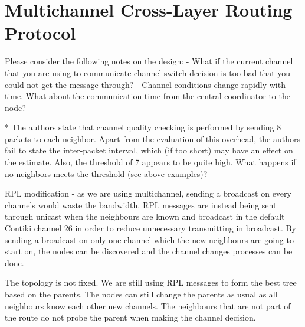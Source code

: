 \section{Multichannel Cross-Layer Routing Protocol}
\label{sec:multichannel}

Please consider the following notes on the design:
- What if the current channel that you are using to communicate channel-switch decision is  too bad that you could not get the message through?
- Channel conditions change rapidly with time. What about the communication time from the central coordinator to the node?

* The authors state that channel quality checking is performed by sending 8
  packets to each neighbor. Apart from the evaluation of this overhead, the
  authors fail to state the inter-packet interval, which (if too short) may
  have an effect on the estimate. Also, the threshold of 7 appears to be quite
  high. What happens if no neighbors meets the threshold (see above examples)?
  
  
RPL modification - as we are using multichannel, sending a broadcast on every channels would waste the bandwidth. RPL messages are instead being sent through unicast when the neighbours are known and broadcast in the default Contiki channel 26 in order to reduce unnecessary transmitting in broadcast. By sending a broadcast on only one channel which the new neighbours are going to start on, the nodes can be discovered and the channel changes processes can be done. 

The topology is not fixed. We are still using RPL messages to form the best tree based on the parents. The nodes can still change the parents as usual as all neighbours know each other new channels. The neighbours that are not part of the route do not probe the parent when making the channel decision. 